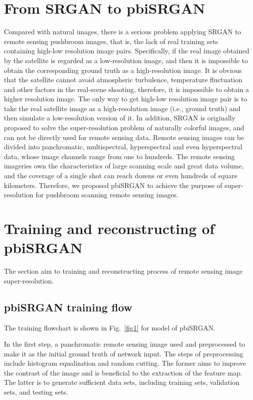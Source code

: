\documentclass[10pt,twocolumn,letterpaper]{article}
\begin{document}
\section{From SRGAN to pbiSRGAN}
Compared with natural images, there is a serious problem applying SRGAN to remote sensing pushbroom images, that is, the lack of real training sets containing high-low resolution image pairs. Specifically, if the real image obtained by the satellite is regarded as a low-resolution image, and then it is impossible to obtain the corresponding ground truth as a high-resolution image. It is obvious that the satellite cannot avoid atmospheric turbulence, temperature fluctuation and other factors in the real-scene shooting, therefore, it is impossible to obtain a higher resolution image. The only way to get high-low resolution image pair is to take the real satellite image as a high-resolution image (i.e., ground truth) and then simulate a low-resolution version of it. In addition, SRGAN is originally proposed to solve the super-resolution problem of naturally colorful images, and can not be directly used for remote sensing data. Remote sensing images can be divided into panchromatic, multispectral, hyperspectral and even hyperspectral data, whose image channels range from one to hundreds. The remote sensing imageries own the characteristics of large scanning scale and great data volume, and the coverage of a single shot can reach dozens or even hundreds of square kilometers. Therefore, we proposed pbiSRGAN to achieve the purpose of super-resolution for pushbroom scanning remote sensing images.

\section{Training and reconstructing of pbiSRGAN}
The section aim to training and reconstructing process of remote sensing image super-resolution. 
\subsection{pbiSRGAN training flow}
The training flowchart is shown in Fig.~\ref{fig1} for model of pbiSRGAN.


In the first step,  a panchromatic remote sensing image used and preprocessed to make it as the initial ground truth of network input. The steps of preprocessing include histogram equalization and random cutting. The former aims to improve the contrast of the image and is beneficial to the extraction of the feature map. The latter is to generate sufficient data sets, including training sets, validation sets, and testing sets.
\end{document}
